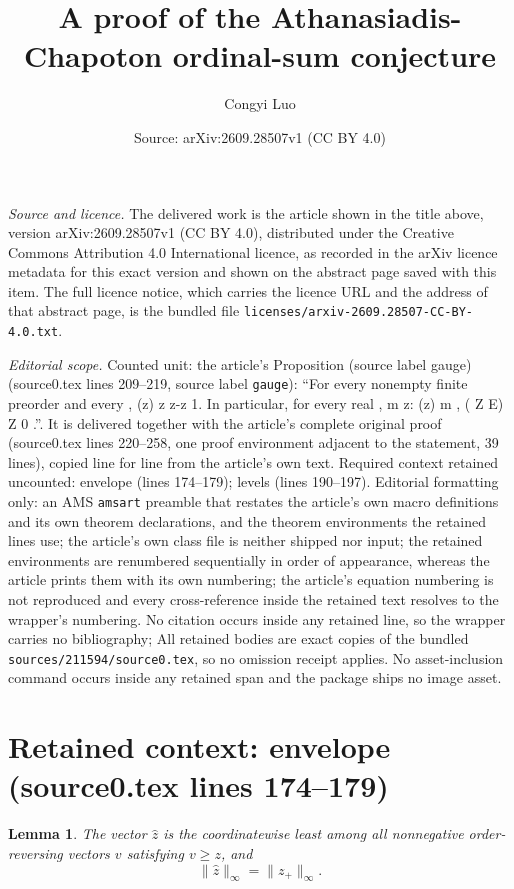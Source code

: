 \documentclass[10pt,a4paper]{amsart}
\title[A proof of the Athanasiadis-Chapoton ordinal-sum conjecture]{A proof of the Athanasiadis-Chapoton ordinal-sum conjecture}
\author{Congyi Luo}
\date{Source: arXiv:2609.28507v1 (CC BY 4.0)}
\theoremstyle{plain}
\newtheorem{lemma}[theorem]{Lemma}
\theoremstyle{definition}
\theoremstyle{remark}
\theoremstyle{definition}
\begin{document}
\maketitle

\noindent\emph{Source and licence.} The delivered work is the article shown in the title above, version arXiv:2609.28507v1 (CC BY 4.0), distributed under the Creative Commons Attribution 4.0 International licence, as recorded in the arXiv licence metadata for this exact version and shown on the abstract page saved with this item. The full licence notice, which carries the licence URL and the address of that abstract page, is the bundled file \texttt{licenses/arxiv-2609.28507-CC-BY-4.0.txt}.
\par\smallskip

\noindent\textit{Editorial scope.} Counted unit: the article's Proposition (source label gauge) (source0.tex lines 209--219, source label \texttt{gauge}): ``For every nonempty finite preorder and every , (z) z z-z 1. In particular, for every real , m z: (z) m , ( Z E) Z 0 .''. It is delivered together with the article's complete original proof (source0.tex lines 220--258, one proof environment adjacent to the statement, 39 lines), copied line for line from the article's own text. Required context retained uncounted: envelope (lines 174--179); levels (lines 190--197). Editorial formatting only: an AMS \texttt{amsart} preamble that restates the article's own macro definitions and its own theorem declarations, and the theorem environments the retained lines use; the article's own class file is neither shipped nor input; the retained environments are renumbered sequentially in order of appearance, whereas the article prints them with its own numbering; the article's equation numbering is not reproduced and every cross-reference inside the retained text resolves to the wrapper's numbering. No citation occurs inside any retained line, so the wrapper carries no bibliography; All retained bodies are exact copies of the bundled \texttt{sources/211594/source0.tex}, so no omission receipt applies. No asset-inclusion command occurs inside any retained span and the package ships no image asset.


\section*{Retained context: envelope (source0.tex lines 174--179)}

\begin{lemma}\label{envelope}
The vector $\widehat z$ is the coordinatewise least among all nonnegative order-reversing vectors $v$ satisfying $v\ge z$, and
\begin{equation}\label{maxenvelope}
 \|\widehat z\|_\infty=\|z_+\|_\infty.
\end{equation}
\end{lemma}
\end{document}
